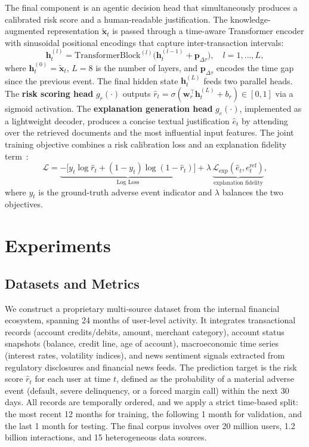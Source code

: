 \documentclass[10pt,twocolumn]{article}
\begin{document}
The final component is an agentic decision head that simultaneously produces a calibrated risk score and a human-readable justification.
The knowledge-augmented representation $\tilde{\mathbf{x}}_t$ is passed through a time-aware Transformer encoder with sinusoidal positional encodings that capture inter-transaction intervals:
\begin{equation}
\mathbf{h}_t^{(l)} = \text{TransformerBlock}^{(l)}\bigl(\mathbf{h}_t^{(l-1)} + \mathbf{p}_{\Delta\tau}\bigr), \quad l = 1,\dots,L,
\label{eq:transformer}
\end{equation}
where $\mathbf{h}_t^{(0)} = \tilde{\mathbf{x}}_t$, $L=8$ is the number of layers, and $\mathbf{p}_{\Delta\tau}$ encodes the time gap since the previous event.
The final hidden state $\mathbf{h}_t^{(L)}$ feeds two parallel heads. The \textbf{risk scoring head} $g_r(\cdot)$ outputs $\hat{r}_t = \sigma(\mathbf{w}_r^{\top} \mathbf{h}_t^{(L)} + b_r) \in [0,1]$ via a sigmoid activation. The \textbf{explanation generation head} $g_e(\cdot)$, implemented as a lightweight decoder, produces a concise textual justification $\hat{e}_t$ by attending over the retrieved documents and the most influential input features.
The joint training objective combines a risk calibration loss and an explanation fidelity term~\cite{arxiv-2512.06105,arxiv-2511.21042}:
\begin{equation}
\mathcal{L} = \underbrace{-\bigl[y_t \log \hat{r}_t + (1-y_t) \log(1-\hat{r}_t)\bigr]}_{\text{Log Loss}} + \lambda \,\underbrace{\mathcal{L}_{\text{exp}}(\hat{e}_t, e_t^{\text{ref}})}_{\text{explanation fidelity}},
\label{eq:loss}
\end{equation}
where $y_t$ is the ground-truth adverse event indicator and $\lambda$ balances the two objectives.

\section{Experiments}

\subsection{Datasets and Metrics}
We construct a proprietary multi‑source dataset from the internal financial ecosystem, spanning 24 months of user‑level activity. It integrates transactional records (account credits/debits, amount, merchant category), account status snapshots (balance, credit line, age of account), macroeconomic time series (interest rates, volatility indices), and news sentiment signals extracted from regulatory disclosures and financial news feeds. The prediction target is the risk score \(\hat{r}_t\) for each user at time \(t\), defined as the probability of a material adverse event (default, severe delinquency, or a forced margin call) within the next 30 days. All records are temporally ordered, and we apply a strict time‑based split: the most recent 12 months for training, the following 1 month for validation, and the last 1 month for testing. The final corpus involves over 20 million users, 1.2 billion interactions, and 15 heterogeneous data sources.
\end{document}
